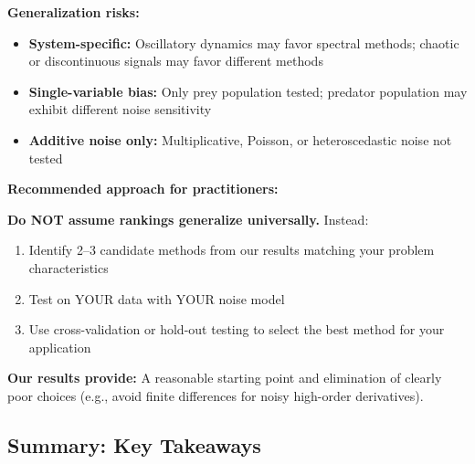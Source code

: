 \textbf{Generalization risks:}
\begin{itemize}
    \item \textbf{System-specific:} Oscillatory dynamics may favor spectral methods; chaotic or discontinuous signals may favor different methods
    \item \textbf{Single-variable bias:} Only prey population tested; predator population may exhibit different noise sensitivity
    \item \textbf{Additive noise only:} Multiplicative, Poisson, or heteroscedastic noise not tested
\end{itemize}

\textbf{Recommended approach for practitioners:}

\textbf{Do NOT assume rankings generalize universally.}
Instead:
\begin{enumerate}
    \item Identify 2--3 candidate methods from our results matching your problem characteristics
    \item Test on YOUR data with YOUR noise model
    \item Use cross-validation or hold-out testing to select the best method for your application
\end{enumerate}

\textbf{Our results provide:} A reasonable starting point and elimination of clearly poor choices (e.g., avoid finite differences for noisy high-order derivatives).

\subsection{Summary: Key Takeaways}
\label{sec:takeaways}

